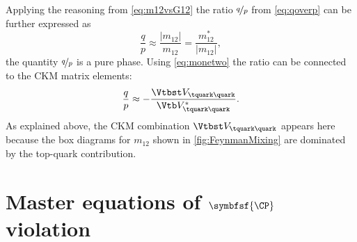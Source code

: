 Applying the reasoning from \cref{eq:m12vsG12} the ratio $\nicefrac{q}{p}$ from \cref{eq:qoverp} can be further expressed as
\begin{equation}
\frac{q}{p}\approx\frac{\left|m_{12}\right|}{m_{12}}=\frac{m_{12}^\ast}{\left|m_{12}\right|},\label{eq:qoverPPurePhase}
\end{equation}
\ie the quantity $\nicefrac{q}{p}$ is a pure phase.
Using \cref{eq:monetwo} the ratio can be connected to the CKM matrix elements:
\begin{equation}
\frac{q}{p}\approx-\frac{\Vtbst V_{\tquark\quark}}{\Vtb V_{\tquark\quark}^\ast}\label{eq:qoverpCKM}.
\end{equation}
As explained above, the CKM combination $\Vtbst V_{\tquark\quark}$ appears here because the box diagrams for $m_{12}$ shown in \cref{fig:FeynmanMixing} are dominated by the top-quark contribution.


\section[head={Master equations of \CP violation},tocentry={Master equations of \CP violation}]{Master equations of $\symbfsf{\CP}$ violation}
\label{sec:formulaeCPV}

